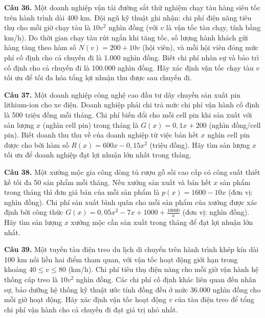 \documentclass[12pt]{article}
\begin{document}
	\vspace{0.6cm}
	\noindent \textbf{Câu 36.} Một doanh nghiệp vận tải đường sắt thử nghiệm chạy tàu hàng siêu tốc trên hành trình dài 400 km. Đội ngũ kỹ thuật ghi nhận: chi phí điện năng tiêu thụ cho mỗi giờ chạy tàu là $10v^2$ nghìn đồng (với $v$ là vận tốc tàu chạy, tính bằng km/h). Do thời gian chạy tàu rút ngắn khi tăng tốc, số lượng hành khách gửi hàng tăng theo hàm số $N(v) = 200 + 10v$ (hội viên), và mỗi hội viên đóng mức phí cố định cho cả chuyến đi là 1.000 nghìn đồng. Biết chi phí nhân sự và bảo trì cố định cho cả chuyến đi là 100.000 nghìn đồng. Hãy xác định vận tốc chạy tàu $v$ tối ưu để tối đa hóa tổng lợi nhuận thu được sau chuyến đi.
	
	\vspace{0.6cm}
	\noindent \textbf{Câu 37.} Một doanh nghiệp công nghệ cao đầu tư dây chuyền sản xuất pin lithium-ion cho xe điện. Doanh nghiệp phải chi trả mức chi phí vận hành cố định là 500 triệu đồng mỗi tháng. Chi phí biến đổi cho mỗi cell pin khi sản xuất với sản lượng $x$ (nghìn cell pin) trong tháng là $G(x) = 0,1x + 200$ (nghìn đồng/cell pin). Biết doanh thu thu về của doanh nghiệp từ việc bán hết $x$ nghìn cell pin được cho bởi hàm số $R(x) = 600x - 0,15x^2$ (triệu đồng). Hãy tìm sản lượng $x$ tối ưu để doanh nghiệp đạt lợi nhuận lớn nhất trong tháng.
	
	\vspace{0.6cm}
	\noindent \textbf{Câu 38.} Một xưởng mộc gia công dòng tủ rượu gỗ sồi cao cấp có công suất thiết kế tối đa 50 sản phẩm mỗi tháng. Nếu xưởng sản xuất và bán hết $x$ sản phẩm trong tháng thì đơn giá bán của mỗi sản phẩm là $p(x) = 1600 - 10x$ (đơn vị: nghìn đồng). Chi phí sản xuất bình quân cho mỗi sản phẩm của xưởng được xác định bởi công thức $G(x) = 0,05x^2 - 7x + 1000 + \frac{10000}{x}$ (đơn vị: nghìn đồng). Hãy tìm sản lượng $x$ xưởng mộc cần sản xuất trong tháng để đạt lợi nhuận lớn nhất.
	
	\vspace{0.6cm}
	\noindent \textbf{Câu 39.} Một tuyến tàu điện treo du lịch di chuyển trên hành trình khép kín dài 100 km nối liền hai điểm tham quan, với vận tốc hoạt động giới hạn trong khoảng $40 \le v \le 80$ (km/h). Chi phí tiêu thụ điện năng cho mỗi giờ vận hành hệ thống cáp treo là $10v^2$ nghìn đồng. Các chi phí cố định khác liên quan đến nhân sự, bảo dưỡng hệ thống kỹ thuật ước tính đồng đều ở mức 36.000 nghìn đồng cho mỗi giờ hoạt động. Hãy xác định vận tốc hoạt động $v$ của tàu điện treo để tổng chi phí vận hành cho cả chuyến đi đạt giá trị nhỏ nhất.
	
\end{document}
